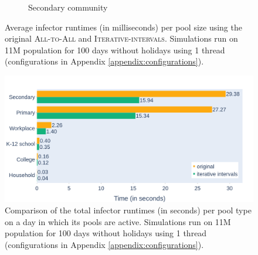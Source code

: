 \begin{figure}
\begin{subfigure}{.78\linewidth}
        \caption{Secondary community}
        \label{fig:times_avg_ii_secondary}
    \end{subfigure}
    \caption{Average infector runtimes (in milliseconds) per pool size using the original \textsc{All-to-All} and \textsc{Iterative-intervals}. Simulations run on 11M population for 100 days without holidays using 1 thread (configurations in Appendix \ref{appendix:configurations}).}
    \label{fig:times_avg_ii}
\end{figure}

\begin{figure}
    \centering
    \includegraphics[width=\linewidth]{4 - Sampling/fig/iterative_intervals/ii_vs_standard_type_totals.png}
    \caption{Comparison of the total infector runtimes (in seconds) per pool type on a day in which its pools are active. Simulations run on 11M population for 100 days without holidays using 1 thread (configurations in Appendix \ref{appendix:configurations}).}
    \label{fig:ii_vs_standard_type_totals}
\end{figure}


